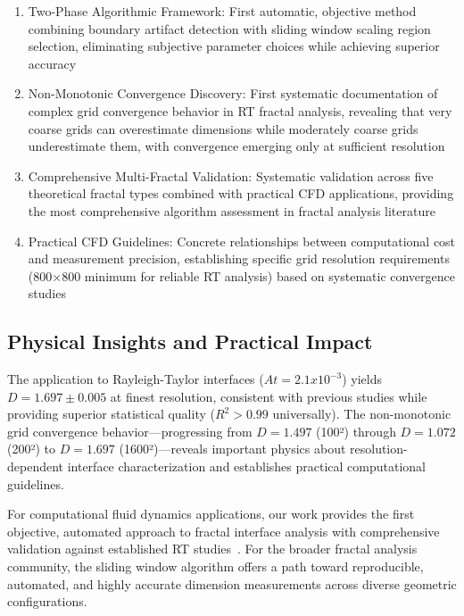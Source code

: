 \documentclass[preprint,12pt]{elsarticle}
\def\textbf#1{#1}%
\def\times{x}%
\begin{document}
\begin{enumerate}
\item \textbf{Two-Phase Algorithmic Framework}: First automatic, objective method combining boundary artifact detection with sliding window scaling region selection, eliminating subjective parameter choices while achieving superior accuracy

\item \textbf{Non-Monotonic Convergence Discovery}: First systematic documentation of complex grid convergence behavior in RT fractal analysis, revealing that very coarse grids can overestimate dimensions while moderately coarse grids underestimate them, with convergence emerging only at sufficient resolution

\item \textbf{Comprehensive Multi-Fractal Validation}: Systematic validation across five theoretical fractal types combined with practical CFD applications, providing the most comprehensive algorithm assessment in fractal analysis literature

\item \textbf{Practical CFD Guidelines}: Concrete relationships between computational cost and measurement precision, establishing specific grid resolution requirements (800×800 minimum for reliable RT analysis) based on systematic convergence studies
\end{enumerate}

\subsection{Physical Insights and Practical Impact}

The application to Rayleigh-Taylor interfaces ($At = 2.1 \times 10^{-3}$) yields $D = 1.697 \pm 0.005$ at finest resolution, consistent with previous studies while providing superior statistical quality ($R^2 > 0.99$ universally). The non-monotonic grid convergence behavior—progressing from $D = 1.497$ (100²) through $D = 1.072$ (200²) to $D = 1.697$ (1600²)—reveals important physics about resolution-dependent interface characterization and establishes practical computational guidelines.

For computational fluid dynamics applications, our work provides the first objective, automated approach to fractal interface analysis with comprehensive validation against established RT studies~\cite{syromyatnikov1993,dalziel1999}. For the broader fractal analysis community, the sliding window algorithm offers a path toward reproducible, automated, and highly accurate dimension measurements across diverse geometric configurations.
\end{document}
